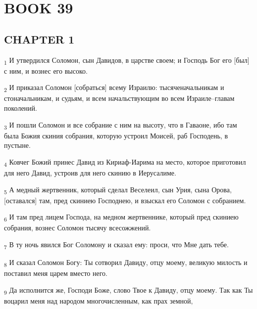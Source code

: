 \section{BOOK 39}
\subsection{CHAPTER 1}
\begin{tcolorbox}
\textsubscript{1} И утвердился Соломон, сын Давидов, в царстве своем; и Господь Бог его [был] с ним, и вознес его высоко.
\end{tcolorbox}
\begin{tcolorbox}
\textsubscript{2} И приказал Соломон [собраться] всему Израилю: тысяченачальникам и стоначальникам, и судьям, и всем начальствующим во всем Израиле--главам поколений.
\end{tcolorbox}
\begin{tcolorbox}
\textsubscript{3} И пошли Соломон и все собрание с ним на высоту, что в Гаваоне, ибо там была Божия скиния собрания, которую устроил Моисей, раб Господень, в пустыне.
\end{tcolorbox}
\begin{tcolorbox}
\textsubscript{4} Ковчег Божий принес Давид из Кириаф-Иарима на место, которое приготовил для него Давид, устроив для него скинию в Иерусалиме.
\end{tcolorbox}
\begin{tcolorbox}
\textsubscript{5} А медный жертвенник, который сделал Веселеил, сын Урия, сына Орова, [оставался] там, пред скиниею Господнею, и взыскал его Соломон с собранием.
\end{tcolorbox}
\begin{tcolorbox}
\textsubscript{6} И там пред лицем Господа, на медном жертвеннике, который пред скиниею собрания, вознес Соломон тысячу всесожжений.
\end{tcolorbox}
\begin{tcolorbox}
\textsubscript{7} В ту ночь явился Бог Соломону и сказал ему: проси, что Мне дать тебе.
\end{tcolorbox}
\begin{tcolorbox}
\textsubscript{8} И сказал Соломон Богу: Ты сотворил Давиду, отцу моему, великую милость и поставил меня царем вместо него.
\end{tcolorbox}
\begin{tcolorbox}
\textsubscript{9} Да исполнится же, Господи Боже, слово Твое к Давиду, отцу моему. Так как Ты воцарил меня над народом многочисленным, как прах земной,
\end{tcolorbox}
